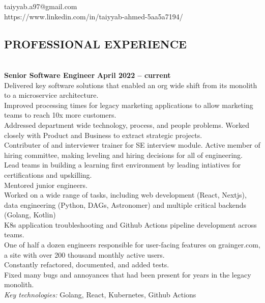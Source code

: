 \documentclass[margin,line]{resume}
\begin{document}
{
    \hfill taiyyab.a97@gmail.com      \vspace{0mm}\\\vspace{0mm}%
    \hfill https://www.linkedin.com/in/taiyyab-ahmed-5aa5a7194/ \vspace{0mm}\\\vspace{-9mm}%
}

\begin{resume}

    \section{\mysidestyle \textbf{\large{P}\small{ROFESSIONAL} \large{E}\small{XPERIENCE}}}

    \vspace{1mm}\\%
    \textbf{Senior Software Engineer} \hfill \textbf{April 2022 -- current}\\
    Delivered key software solutions that enabled an org wide shift from its monolith to a microservice architecture.\\
    Improved processing times for legacy marketing applications to allow marketing teams to reach 10x more customers.\\
    Addressed department wide technology, process, and people problems. Worked closely with Product and Business to extract strategic projects.\\
    Contributer of and interviewer trainer for SE interview module.  Active member of hiring committee, making leveling and hiring decisions for all of engineering.\vspace{1mm}\\
    Lead teams in building a learning first environment by leading intiatives for certifications and upskilling.\\
    Mentored junior engineers.\\
    Worked on a wide range of tasks, including web development (React, Nextjs), data engineering (Python, DAGs, Astronomer) and multiple critical backends (Golang, Kotlin)\\
    K8s application troubleshooting and Github Actions pipeline development across teams.\\
    One of half a dozen engineers responsible for user-facing features on grainger.com, a site with over 200 thousand monthly active users.\\
    Constantly refactored, documented, and added tests.\\
    Fixed many bugs and annoyances that had been present for years in the legacy monolith.\\
    \textit{Key technologies:} Golang, React, Kubernetes, Github Actions\\


\end{resume}
\end{document}
